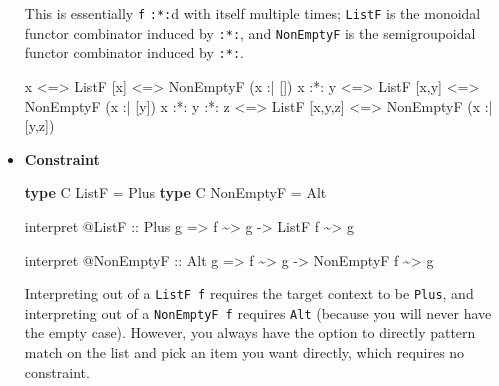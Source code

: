 \documentclass[]{article}
\newenvironment{Shaded}{}{}
\newcommand{\DataTypeTok}[1]{\textcolor[rgb]{0.56,0.13,0.00}{#1}}
\newcommand{\KeywordTok}[1]{\textcolor[rgb]{0.00,0.44,0.13}{\textbf{#1}}}
\newcommand{\NormalTok}[1]{#1}
\newcommand{\OperatorTok}[1]{\textcolor[rgb]{0.40,0.40,0.40}{#1}}
\newcommand{\OtherTok}[1]{\textcolor[rgb]{0.00,0.44,0.13}{#1}}
\begin{document}
\begin{itemize}
  This is essentially \texttt{f} \texttt{:*:}d with itself multiple times;
  \texttt{ListF} is the monoidal functor combinator induced by \texttt{:*:}, and
  \texttt{NonEmptyF} is the semigroupoidal functor combinator induced by
  \texttt{:*:}.

\begin{Shaded}
\begin{Highlighting}[]
\NormalTok{x             }\OperatorTok{<=>} \DataTypeTok{ListF}\NormalTok{ [x]     }\OperatorTok{<=>} \DataTypeTok{NonEmptyF}\NormalTok{ (x }\OperatorTok{:|}\NormalTok{ [])}
\NormalTok{x }\OperatorTok{:*:}\NormalTok{ y       }\OperatorTok{<=>} \DataTypeTok{ListF}\NormalTok{ [x,y]   }\OperatorTok{<=>} \DataTypeTok{NonEmptyF}\NormalTok{ (x }\OperatorTok{:|}\NormalTok{ [y])}
\NormalTok{x }\OperatorTok{:*:}\NormalTok{ y }\OperatorTok{:*:}\NormalTok{ z }\OperatorTok{<=>} \DataTypeTok{ListF}\NormalTok{ [x,y,z] }\OperatorTok{<=>} \DataTypeTok{NonEmptyF}\NormalTok{ (x }\OperatorTok{:|}\NormalTok{ [y,z])}
\end{Highlighting}
\end{Shaded}
\item
  \textbf{Constraint}

\begin{Shaded}
\begin{Highlighting}[]
\KeywordTok{type} \DataTypeTok{C} \DataTypeTok{ListF}     \OtherTok{=} \DataTypeTok{Plus}
\KeywordTok{type} \DataTypeTok{C} \DataTypeTok{NonEmptyF} \OtherTok{=} \DataTypeTok{Alt}

\NormalTok{interpret }\OperatorTok{@}\DataTypeTok{ListF}
\OtherTok{    ::} \DataTypeTok{Plus}\NormalTok{ g}
    \OtherTok{=>}\NormalTok{ f }\OperatorTok{\textasciitilde{}>}\NormalTok{ g}
    \OtherTok{{-}>} \DataTypeTok{ListF}\NormalTok{ f }\OperatorTok{\textasciitilde{}>}\NormalTok{ g}

\NormalTok{interpret }\OperatorTok{@}\DataTypeTok{NonEmptyF}
\OtherTok{    ::} \DataTypeTok{Alt}\NormalTok{ g}
    \OtherTok{=>}\NormalTok{ f }\OperatorTok{\textasciitilde{}>}\NormalTok{ g}
    \OtherTok{{-}>} \DataTypeTok{NonEmptyF}\NormalTok{ f }\OperatorTok{\textasciitilde{}>}\NormalTok{ g}
\end{Highlighting}
\end{Shaded}

  Interpreting out of a \texttt{ListF\ f} requires the target context to be
  \texttt{Plus}, and interpreting out of a \texttt{NonEmptyF\ f} requires
  \texttt{Alt} (because you will never have the empty case). However, you always
  have the option to directly pattern match on the list and pick an item you
  want directly, which requires no constraint.
\end{itemize}
\end{document}
